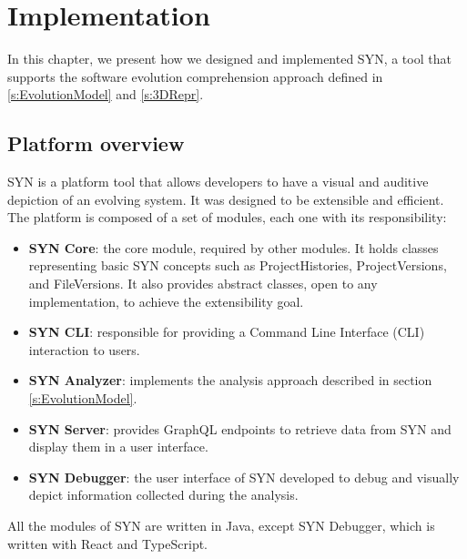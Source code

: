 
\chapter[Implementation]{Implementation}
\graphicspath{ {images/implementation} }
In this chapter, we present how we designed and implemented SYN, a tool that supports the software evolution comprehension approach 
defined in \autoref{s:EvolutionModel} and \autoref{s:3DRepr}. 


\section{Platform overview}

SYN is a platform tool that allows developers to have a visual and auditive depiction of an evolving system. 
It was designed to be extensible and efficient. The platform is composed of a set of modules, each one with its responsibility:
\begin{itemize}
    \item \textbf{SYN Core}: the core module, required by other modules. It holds classes representing basic SYN concepts such as ProjectHistories, ProjectVersions, and FileVersions. It also provides abstract classes, open to any implementation, to achieve the extensibility goal.
    \item \textbf{SYN CLI}: responsible for providing a Command Line Interface (CLI) interaction to users.
    \item \textbf{SYN Analyzer}: implements the analysis approach described in section \ref{s:EvolutionModel}. 
    \item \textbf{SYN Server}: provides GraphQL endpoints to retrieve data from SYN and display them in a user interface. 
    \item \textbf{SYN Debugger}: the user interface of SYN developed to debug and visually depict information collected during the analysis. 
\end{itemize}

All the modules of SYN are written in Java, except SYN Debugger, which is written with React and TypeScript. 

